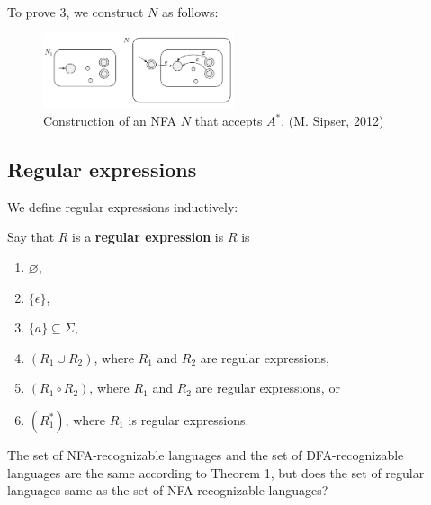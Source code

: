\begin{proofidea}
\begin{figure}[htbp]
{    }
\end{figure}
\\ To prove $3$, we construct $N$ as follows:
\begin{figure}[htbp] \centering
    \includegraphics[width=0.5\textwidth]{figures/3.PNG}
    \caption{\label{fig:figure/1.PNG}
        Construction of an NFA $N$ that accepts $A^{*}$. (M. Sipser, 2012)
    }
\end{figure}
\end{proofidea}

\subsection{Regular expressions} \label{sec:}
We define regular expressions inductively:
\begin{definition}
Say that $R$ is a \textbf{regular expression} is $R$ is
\begin{enumerate}
    \item $\varnothing$,
    \item $\{ \epsilon \}$,
    \item $\{ a \} \subseteq \Sigma$,
    \item $(R_1 \cup R_2)$, where $R_1$ and $R_2$ are regular expressions,
    \item $(R_1 \circ R_2)$, where $R_1$ and $R_2$ are regular expressions, or
    \item $(R_1^{*})$, where $R_1$ is regular expressions.
\end{enumerate}
\end{definition}

The set of NFA-recognizable languages and the set of DFA-recognizable languages are the same according to Theorem 1, but does the set of regular languages same as the set of NFA-recognizable languages? 

